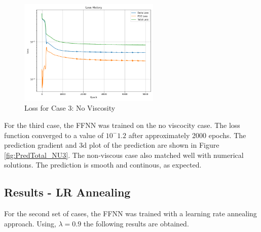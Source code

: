 \documentclass[11pt]{article}
\begin{document}
\begin{figure}[h]
    \centering
    \includegraphics[width=0.6\textwidth]{1D_Loss_NU3.png}
    \caption{Loss for Case 3: No Viscosity}
    \label{fig:Loss_NU3}
\end{figure}

For the third case, the FFNN was trained on the no viscocity case. The loss function converged to a value of $10^-1.2$ after approximately 2000 epochs. The prediction gradient and 3d plot of the prediction are shown in Figure \ref{fig:PredTotal_NU3}. The non-viscous case also matched well with numerical solutions. The prediction is smooth and continous, as expected.
\subsection{Results - LR Annealing}
For the second set of cases, the FFNN was trained with a learning rate annealing approach. Using, $\lambda=0.9$ the following results are obtained.
\end{document}

